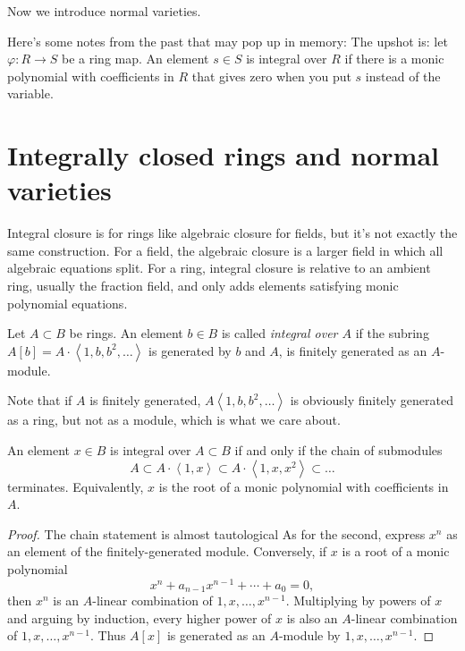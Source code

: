 \medskip\noindent
Now we introduce normal varieties.

Here's some notes from the past that may pop
up in memory: The upshot is: let $\varphi:R
\to S$ be a ring map. An element $s \in S$ is
integral over $R$ if there is a monic
polynomial with coefficients in $R$ that
gives zero when you put $s$ instead of the
variable.

\section{Integrally closed rings
and normal varieties}
\label{section-integrally-closed}

Integral closure is for rings like 
algebraic closure for fields,
but it's not exactly the same construction.
For a field, the algebraic closure is a
larger field in which all algebraic equations
split.
For a ring, integral closure is relative to
an ambient ring, usually the fraction field,
and only adds elements satisfying monic
polynomial equations.

\begin{definition}
\label{definition-integral-element}
Let $A \subset B$ be rings. An element $b \in
B$ is called {\it integral over $A$} if the
subring
$A[b]=A\cdot \left\langle{}1,b,b^2,\ldots\right\rangle{}$
is generated by $b$ and $A$, is finitely
generated as an $A$-module.
\end{definition}

\noindent
Note that if $A$ is finitely generated, $A
\left\langle{}1,b,b^2,\ldots\right\rangle{}$ is obviously
finitely
generated as a ring, but not as a module,
which is what we care about.

\begin{lemma}
\label{lemma-integral-element-fg-submodule}
An element $x \in B$ is integral over $A
\subset B$
if and only if
the chain of submodules
$$
A \subset A\cdot \left\langle{}1,x\right\rangle{}
\subset A \cdot\left\langle{}1,x,x^2\right\rangle{}
\subset…
$$
terminates.
Equivalently, $x$ is the root of a
monic polynomial with coefficients in $A$.
\end{lemma}

\begin{proof}
The chain statement is almost tautological
As for the second, express $x^n$ as an
element of the finitely-generated module.
Conversely, if $x$ is a root of a monic
polynomial
$$
x^n+a_{n-1}x^{n-1}+\cdots+a_0=0,
$$
then $x^n$ is an $A$-linear combination of
$1,x,\ldots,x^{n-1}$.
Multiplying by powers of $x$ and arguing by
induction, every higher power of $x$ is also
an $A$-linear combination of
$1,x,\ldots,x^{n-1}$.
Thus $A[x]$ is generated as an $A$-module by
$1,x,\ldots,x^{n-1}$.
\end{proof}

